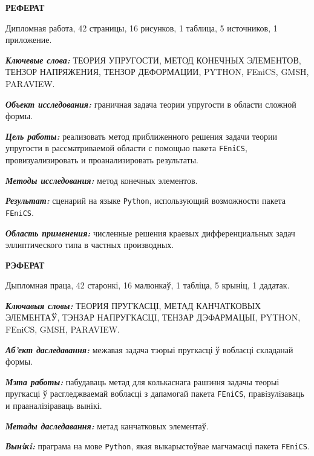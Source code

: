 \documentclass[a4paper, 14pt]{extreport}
\begin{document}
\clearpage
\setcounter{page}{2}

\tableofcontents



\newpage
{}
\begin{center}
	\Large{\textbf{РЕФЕРАТ}}
\end{center}

Дипломная работа, 42 страницы, 16 рисунков, 1 таблица, 
5 источников, 1 приложение.

\textbf{\textit{Ключевые слова:}} ТЕОРИЯ УПРУГОСТИ, МЕТОД КОНЕЧНЫХ 
ЭЛЕМЕНТОВ, ТЕНЗОР НАПРЯЖЕНИЯ, ТЕНЗОР ДЕФОРМАЦИИ, PYTHON, FEniCS, 
GMSH, PARAVIEW.

\textbf{\textit{Объект исследования:}} граничная задача теории 
упругости в области сложной формы.

\textbf{\textit{Цель работы:}} реализовать метод приближенного решения
задачи теории упругости в рассматриваемой области с помощью пакета
\texttt{FEniCS}, провизуализировать и проанализировать результаты.

\textbf{\textit{Методы исследования:}} метод конечных элементов.

\textbf{\textit{Результат:}} сценарий на языке \texttt{Python},
использующий возможности пакета \texttt{FEniCS}.

\textbf{\textit{Область применения:}} численные решения краевых 
дифференциальных задач эллиптического типа в частных производных.

\begin{center}
	\Large{\textbf{РЭФЕРАТ}}
\end{center}

Дыпломная праца, 42 старонкі, 16 малюнкаў, 1 табліца, 
5 крыніц, 1 дадатак.

\textbf{\textit{Ключавыя словы:}} ТЕОРИЯ ПРУГКАСЦІ, МЕТАД КАНЧАТКОВЫХ \\
ЭЛЕМЕНТАЎ, ТЭНЗАР НАПРУГКАСЦI, ТЕНЗАР ДЭФАРМАЦЫІ, PYTHON, \\ FEniCS, 
GMSH, PARAVIEW.

\textbf{\textit{Аб'ект даследавання:}} межавая задача тэорыі 
пругкасці ў вобласці складанай формы.

\textbf{\textit{Мэта работы:}} пабудаваць метад для колькаснага 
рашэння задачы теорыі пругкасці ў расгледжваемай вобласці з
дапамогай пакета \texttt{FEniCS}, правiзулiзаваць и прааналізіраваць вынікі.

\textbf{\textit{Метады даследавання:}} метад канчатковых элементаў.

\textbf{\textit{Вынiкi:}} праграма на мове \texttt{Python},
якая выкарыстоўвае магчамасці пакета \texttt{FEniCS}.
\end{document}
